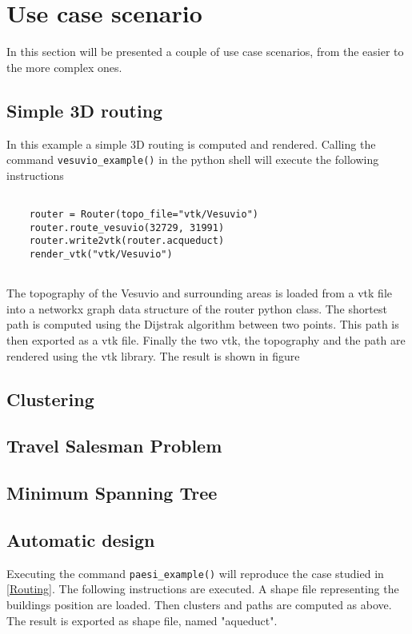 \chapter{Use case scenario}
\label{appendiceE}
\thispagestyle{empty}

\noindent In this section will be presented a couple of use case scenarios, from the easier to 
the more complex ones.

\section{Simple 3D routing}

In this example a simple 3D routing is computed and rendered. Calling the command \verb|vesuvio_example()|
in the python shell will execute the following instructions 

\begin{lstlisting}

	router = Router(topo_file="vtk/Vesuvio")
    router.route_vesuvio(32729, 31991)
    router.write2vtk(router.acqueduct)
	render_vtk("vtk/Vesuvio")
		
\end{lstlisting}
    

The topography of the Vesuvio and surrounding areas is loaded from a vtk file into a networkx graph 
data structure of the router python class. The shortest path is computed using the Dijstrak algorithm 
between two points. This path is then exported as a vtk file. Finally the two vtk, the topography and the path are rendered using the vtk library. The result is shown in figure 


\section{Clustering}
\section{Travel Salesman Problem}
\section{Minimum Spanning Tree}



\section{Automatic design}
Executing the command \verb|paesi_example()| will reproduce the case studied in \ref{Routing}. The following 
instructions are executed. A shape file representing the buildings position  
are loaded. Then clusters and paths are computed as above. The result is exported as shape file, 
named "aqueduct".